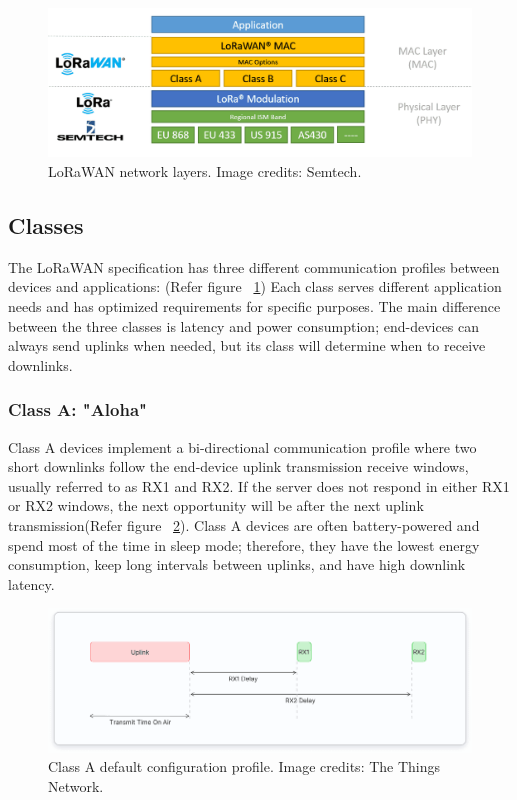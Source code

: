 \begin{figure}
	\begin{center}
		\includegraphics[width=0.7\linewidth]{Images/LORA/NetworkLayer.png}
		\caption{LoRaWAN network layers. Image credits: Semtech.}
		\label{NetworkLayer} 
	\end{center}
\end{figure}

\subsection{Classes}

The LoRaWAN specification has three different communication profiles between devices and applications:  (Refer figure ~\ref{NetworkLayer}) Each class serves different application needs and has optimized requirements for specific purposes. The main difference between the three classes is latency and power consumption; end-devices can always send uplinks when needed, but its class will determine when to receive downlinks. \cite{ArduinoLoRaWAN101:2024}

\subsubsection{Class A: "Aloha"}

Class A devices implement a bi-directional communication profile where two short downlinks follow the end-device uplink transmission receive windows, usually referred to as RX1 and RX2. If the server does not respond in either RX1 or RX2 windows, the next opportunity will be after the next uplink transmission(Refer figure ~\ref{ClassAProfile}). Class A devices are often battery-powered and spend most of the time in sleep mode; therefore, they have the lowest energy consumption, keep long intervals between uplinks, and have high downlink latency.  \cite{ArduinoLoRaWAN101:2024}

\begin{figure}
	\begin{center}
		\includegraphics[width=0.7\linewidth]{Images/LORA/ClassAProfile.png}
		\caption{Class A default configuration profile. Image credits: The Things Network.}
		\label{ClassAProfile} 
	\end{center}
\end{figure}

